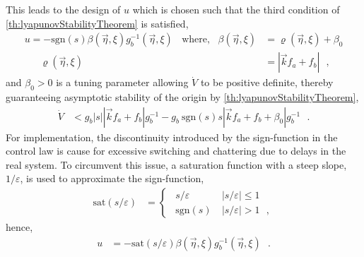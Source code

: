 This leads to the design of $u$ which is chosen such that the third condition of \autoref{th:lyapunovStabilityTheorem} is satisfied,
\begin{align}
u = -\text{sgn}(s)\beta (\vec{\eta},\xi) g_b^{-1}(\vec{\eta},\xi) \ \ \ \ \mathrm{where}, \ \ \ \beta(\vec{\eta},\xi)  &= \varrho(\vec{\eta},\xi) + \beta_0 \\
\ \ \ \ \ \ \  \varrho(\vec{\eta},\xi) &= \left|\vec{k}f_a  +  f_b \right| \ \ \ ,
\label{eq:ssControlBeta0}
\end{align}
and  $\beta_0 > 0$ is a tuning parameter allowing $\dot{V}$ to be positive definite, thereby guaranteeing asymptotic stability of the origin by \autoref{th:lyapunovStabilityTheorem},
\begin{align}
\dot{V} &< g_b |s| \left|\vec{k}f_a +  f_b \right|  g_b^{-1} - g_b\  \mathrm{sgn}(s) s \left|\vec{k}f_a  +  f_b + \beta_0 \right| g_b^{-1} \ \ \ .
\label{eq:lyapunov2}
\end{align}
For implementation, the discontinuity introduced by the sign-function in the control law is cause for excessive switching and chattering due to delays in the real system. To circumvent this issue, a saturation function with a steep slope, $1/\varepsilon$, is used to approximate the sign-function,
\begin{align}
\text{sat}\left( s/\varepsilon \right) &=
\begin{cases}
\ \ s/\varepsilon              &  \ | s/\varepsilon | \leq 1 \\
\ \ \text{sgn}\left( s \right) &  \ | s/\varepsilon |  >   1 \ \ \ ,
\end{cases}
\label{eq:satuationFunction2}
\end{align}
hence,
\begin{align}
u &= -\text{sat}(s/\varepsilon)\beta (\vec{\eta},\xi)  g_b^{-1}(\vec{\eta},\xi)  \ \ \ .
\label{eq:ssControlSat}
\end{align}


